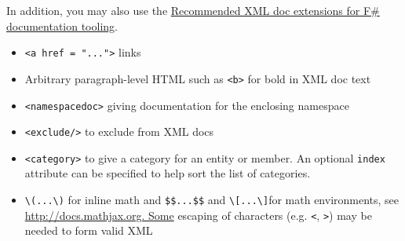 \documentclass{article}
\begin{document}
In addition, you may also use the \href{https://github.com/fsharp/fslang-design/blob/master/tooling/FST-1031-xmldoc-extensions.md}{Recommended XML doc extensions for F\# documentation tooling}.
\begin{itemize}
\item 

\texttt{<a href = "...">} links

\item 

Arbitrary paragraph-level HTML such as \texttt{<b>} for bold in XML doc text

\item 

\texttt{<namespacedoc>} giving documentation for the enclosing namespace

\item 

\texttt{<exclude/>} to exclude from XML docs

\item 

\texttt{<category>} to give a category for an entity or member. An optional \texttt{index} attribute can be specified
to help sort the list of categories.

\item 

\texttt{{\textbackslash}(...{\textbackslash})} for inline math and \texttt{\$\$...\$\$} and \texttt{{\textbackslash}[...{\textbackslash}]}for math environments, see \href{http://docs.mathjax.org.
Some}{http://docs.mathjax.org.
Some} escaping of characters (e.g. \texttt{<}, \texttt{>}) may be needed to form valid XML

\end{itemize}
\end{document}
